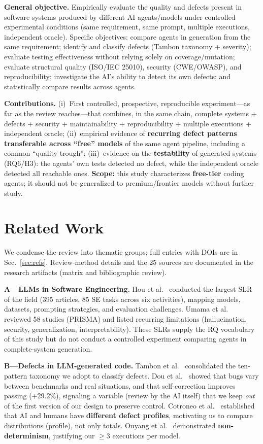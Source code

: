 \documentclass[11pt]{article}
\begin{document}
\textbf{General objective.} Empirically evaluate the quality and defects present in software systems produced by different AI agents/models under controlled experimental conditions (same requirement, same prompt, multiple executions, independent oracle). Specific objectives: compare agents in generation from the same requirement; identify and classify defects (Tambon taxonomy + severity); evaluate testing effectiveness without relying solely on coverage/mutation; evaluate structural quality (ISO/IEC 25010), security (CWE/OWASP), and reproducibility; investigate the AI's ability to detect its own defects; and statistically compare results across agents.

\textbf{Contributions.} (i)~First controlled, prospective, reproducible experiment---as far as the review reaches---that combines, in the same chain, complete systems + defects + security + maintainability + reproducibility + multiple executions + independent oracle; (ii)~empirical evidence of \textbf{recurring defect patterns transferable across ``free'' models} of the same agent pipeline, including a common ``quality trough''; (iii)~evidence on the \textbf{testability} of generated systems (RQ6/H3): the agents' own tests detected no defect, while the independent oracle detected all reachable ones. \textbf{Scope:} this study characterizes \textbf{free-tier} coding agents; it should not be generalized to premium/frontier models without further study.

\section{Related Work}\label{sec:related}

We condense the review into thematic groups; full entries with DOIs are in Sec.~\ref{sec:refs}. Review-method details and the 25 sources are documented in the research artifacts (matrix and bibliographic review).

\textbf{A---LLMs in Software Engineering.} Hou et al.~\cite{A01} conducted the largest SLR of the field (395 articles, 85 SE tasks across six activities), mapping models, datasets, prompting strategies, and evaluation challenges. Umama et al.~\cite{A02} reviewed 58 studies (PRISMA) and listed recurring limitations (hallucination, security, generalization, interpretability). These SLRs supply the RQ vocabulary of this study but do not conduct a controlled experiment comparing agents in complete-system generation.

\textbf{B---Defects in LLM-generated code.} Tambon et al.~\cite{B01} consolidated the ten-pattern taxonomy we adopt to classify defects. Dou et al.~\cite{B02} showed that bugs vary between benchmarks and real situations, and that self-correction improves passing (+29.2\%), signaling a variable (review by the AI itself) that we keep \emph{out} of the first version of our design to preserve control. Cotroneo et al.~\cite{B03} established that AI and humans have \textbf{different defect profiles}, motivating us to compare distributions (profile), not only totals. Ouyang et al.~\cite{B04} demonstrated \textbf{non-determinism}, justifying our $\geq$3 executions per model.
\end{document}
